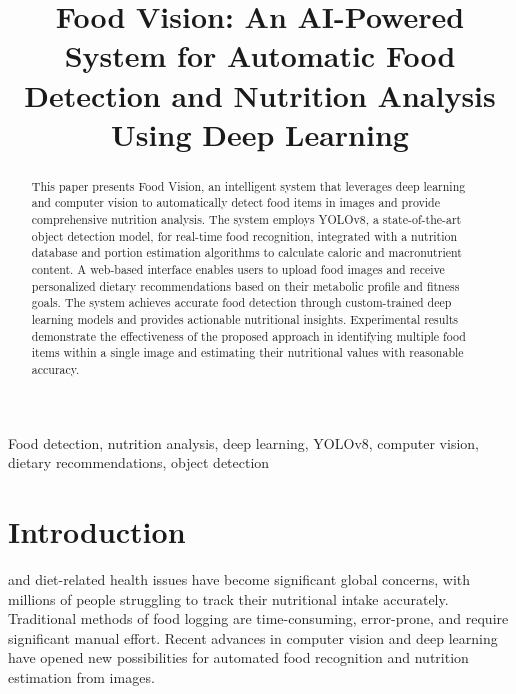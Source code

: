 \documentclass[conference]{IEEEtran}
\begin{document}
\title{Food Vision: An AI-Powered System for Automatic Food Detection and Nutrition Analysis Using Deep Learning}

\author{
}

\maketitle

\begin{abstract}
This paper presents Food Vision, an intelligent system that leverages deep learning and computer vision to automatically detect food items in images and provide comprehensive nutrition analysis. The system employs YOLOv8, a state-of-the-art object detection model, for real-time food recognition, integrated with a nutrition database and portion estimation algorithms to calculate caloric and macronutrient content. A web-based interface enables users to upload food images and receive personalized dietary recommendations based on their metabolic profile and fitness goals. The system achieves accurate food detection through custom-trained deep learning models and provides actionable nutritional insights. Experimental results demonstrate the effectiveness of the proposed approach in identifying multiple food items within a single image and estimating their nutritional values with reasonable accuracy.
\end{abstract}

\begin{IEEEkeywords}
Food detection, nutrition analysis, deep learning, YOLOv8, computer vision, dietary recommendations, object detection
\end{IEEEkeywords}

\section{Introduction}
 and diet-related health issues have become significant global concerns, with millions of people struggling to track their nutritional intake accurately. Traditional methods of food logging are time-consuming, error-prone, and require significant manual effort. Recent advances in computer vision and deep learning have opened new possibilities for automated food recognition and nutrition estimation from images.
\end{document}
